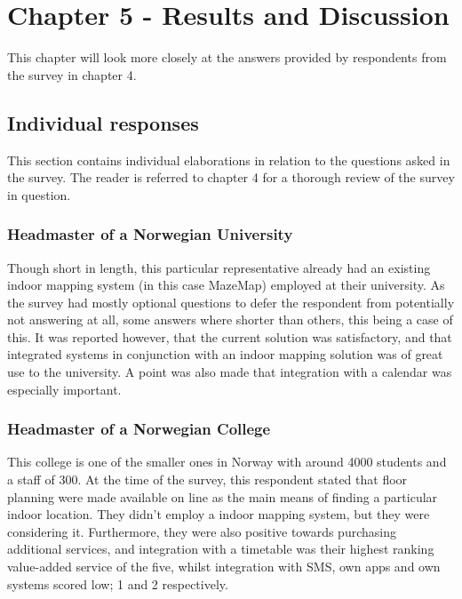 \chapter{Chapter 5 - Results and Discussion}
This chapter will look more closely at the answers provided by respondents from the survey in chapter 4. 
\section{Individual responses}
This section contains individual elaborations in relation to the questions asked in the survey. The reader is referred to chapter 4 for a thorough review of the survey in question.
\subsection{Headmaster of a Norwegian University}
Though short in length, this particular representative already had an existing indoor mapping system (in this case MazeMap) employed at their university. As the survey had mostly optional questions to defer the respondent from potentially not answering at all, some answers where shorter than others, this being a case of this. It was reported however, that the current solution was satisfactory, and that integrated systems in conjunction with an indoor mapping solution was of great use to the university. A point was also made that integration with a calendar was especially important.
\subsection{Headmaster of a Norwegian College}
This college is one of the smaller ones in Norway with around 4000 students and a staff of 300. At the time of the survey, this respondent stated that floor planning were made available on line as the main means of finding a particular indoor location. They didn't employ a indoor mapping system, but they were considering it. Furthermore, they were also positive towards purchasing additional services, and integration with a timetable was their highest ranking value-added service of the five, whilst integration with SMS, own apps and own systems scored low; 1 and 2 respectively.
